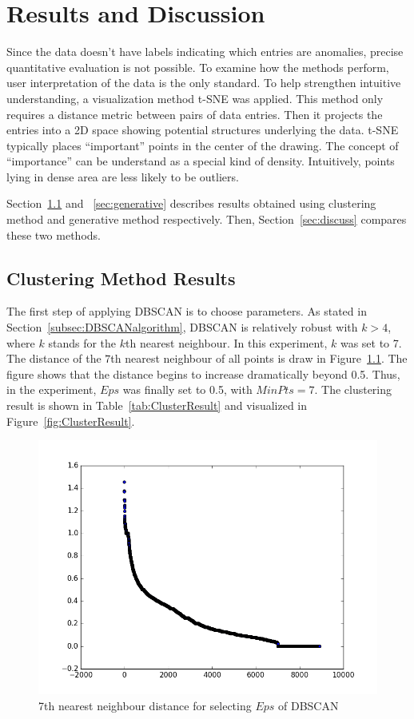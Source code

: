 \chapter{Results and Discussion}
\label{chapter:results}
Since the data doesn't have labels indicating which entries are anomalies, precise quantitative evaluation is not possible. To examine how the methods perform, user interpretation of the data is the only standard. To help strengthen intuitive understanding, a visualization method t-SNE\cite{maaten2008visualizing} was applied. This method only requires a distance metric between pairs of data entries. Then it projects the entries into a 2D space showing potential structures underlying the data. t-SNE typically places ``important'' points in the center of the drawing. The concept of ``importance'' can be understand as a special kind of density. Intuitively, points lying in dense area are less likely to be outliers.

Section~\ref{sec:clustering} and ~\ref{sec:generative} describes results obtained using clustering method and generative method respectively. Then, Section~\ref{sec:discuss} compares these two methods.
\section{Clustering Method Results}
\label{sec:clustering}
The first step of applying DBSCAN is to choose parameters. As stated in Section~\ref{subsec:DBSCANalgorithm}, DBSCAN is relatively robust with $k > 4$, where $k$ stands for the $k$th nearest neighbour. In this experiment, $k$ was set to 7. The distance of the $7$th nearest neighbour of all points is draw in Figure~\ref{fig:paramDBSCAN}. The figure shows that the distance begins to increase dramatically beyond 0.5. Thus, in the experiment, $Eps$ was finally set to 0.5, with $MinPts = 7$. The clustering result is shown in Table~\ref{tab:ClusterResult} and visualized in Figure~\ref{fig:ClusterResult}.
\begin{figure}[!ht]
	\begin{center}
		\includegraphics[width=\textwidth]{images/paramDBSCAN}
		\caption{7th nearest neighbour distance for selecting $Eps$ of DBSCAN}
		\label{fig:paramDBSCAN}
	\end{center}
\end{figure}

